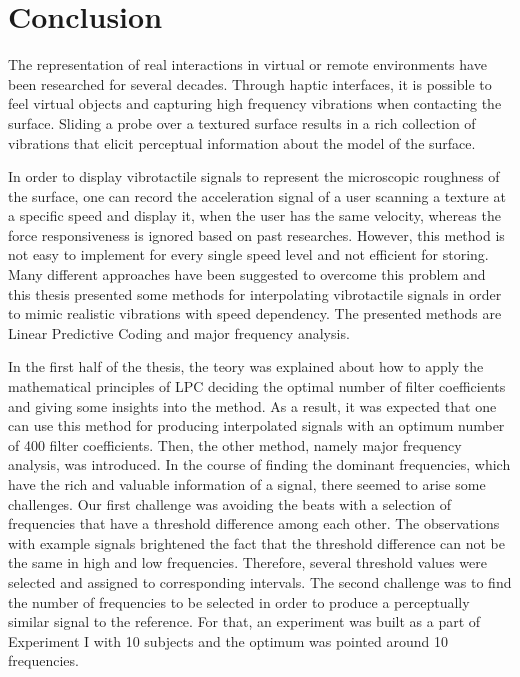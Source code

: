 \chapter{Conclusion}
\thispagestyle{empty}%
The representation of real interactions in virtual or remote environments have been researched for several decades. Through haptic interfaces, it is possible to feel virtual objects and capturing high frequency vibrations when contacting the surface. Sliding a probe over a textured surface results in a rich collection of vibrations that elicit perceptual information about the model of the surface.

In order to display vibrotactile signals to represent the microscopic roughness of the surface, one can record the acceleration signal of a user scanning a texture at a specific speed and display it, when the user has the same velocity, whereas the force responsiveness is ignored based on past researches. However, this method is not easy to implement for every single speed level and not efficient for storing. Many different approaches have been suggested to overcome this problem and this thesis presented some methods for interpolating vibrotactile signals in order to mimic realistic vibrations with speed dependency. The presented methods are Linear Predictive Coding and major frequency analysis.

In the first half of the thesis, the teory was explained about how to apply the mathematical principles of LPC deciding the optimal number of filter coefficients and giving some insights into the method. As a result, it was expected that one can use this method for producing interpolated signals with an optimum number of 400 filter coefficients. Then, the other method, namely major frequency analysis, was introduced. In the course of finding the dominant frequencies, which have the rich and valuable information of a signal, there seemed to arise some challenges. Our first challenge was avoiding the beats with a selection of frequencies that have a threshold difference among each other. The observations with example signals brightened the fact that the threshold difference can not be the same in high and low frequencies. Therefore, several threshold values were selected and assigned to corresponding intervals. The second challenge was to find the number of frequencies to be selected in order to produce a perceptually similar signal to the reference. For that, an experiment was built as a part of Experiment I with 10 subjects and the optimum was pointed around 10 frequencies.

